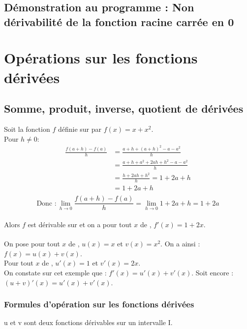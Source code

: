\begin{bdemo}
    \pointille[\textwidth-1cm]
\end{bdemo}


\subsection{Démonstration au programme : Non dérivabilité de la fonction racine carrée en 0}

\begin{bdemo}
    \pointille[\textwidth-1cm]
\end{bdemo}

\section{Opérations sur les fonctions dérivées}
\subsection{Somme, produit, inverse, quotient de dérivées}
\begin{bexemple}
    Soit la fonction $f$ définie sur \R par  $f(x)=x+x^2$.\\
    Pour $h\neq0$:\\ 
    \begin{align*}
    	\frac{f(a+h)-f(a)}{h}&=\frac{a+h+(a+h)^2-a-a^2}{h}\\
    	&=\frac{a+h+a^2+2ah+h^2-a-a^2}{h}\\
    	&=\frac{h+2ah+h^2}{h}=1+2a+h\\
    	&=1+2a+h\\
    \end{align*}
    \[ \text{Donc }:\lim\limits_{h \rightarrow 0} \frac{f(a+h)-f(a)}{h} = \lim\limits_{h \rightarrow 0} 1+2a+h=1+2a\]
    \\
    Alors $f$ est dérivable sur \R et on a pour tout $x$ de \R, $f'(x)=1+2x$.\\
    \\
    On pose pour tout $x$ de \R, $u(x)=x$ et $v(x)=x^2$. On a ainsi : $f(x)=u(x)+v(x)$.\\
    Pour tout $x$ de \R, $u'(x)=1$ et $v'(x)=2x$.\\
    On constate sur cet exemple que : $f'(x)=u'(x)+v'(x)$. Soit encore : $(u+v)'(x)=u'(x)+v'(x)$.
\end{bexemple}
\subsubsection{Formules d'opération sur les fonctions dérivées}
u et v sont deux fonctions dérivables sur un intervalle I.

